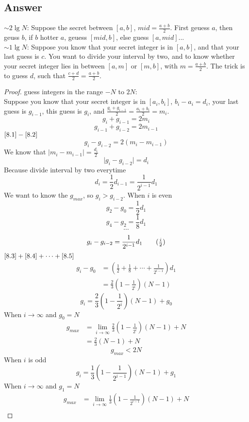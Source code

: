 \documentclass[12pt]{article}
\numberwithin{equation}{section}
\begin{document}
\subsection*{Answer}
$\sim$$2\lg{N}$: Suppose the secret between $[a, b]$, $mid=\frac{a+b}{2}$. First geuess $a$, then geuss $b$,
if $b$ hotter $a$, geuess $[mid, b]$, else guess $[a, mid]$...\\
$\sim$$1\lg{N}$: Suppose you know that your secret integer is in $[a,b]$, and that your last guess is $c$.
You want to divide your interval by two, and to know whether your secret integer lies in between $[a, m]$ or
$[m, b]$, with $m=\frac{a+b}{2}$. The trick is to guess $d$, such that $\frac{c+d}{2}=\frac{a+b}{2}$.
\begin{proof}
    guess integers in the range $-N$ to $2N$:\\
    Suppose you know that your secret integer is in $[a_i,b_i]$, $b_i-a_i=d_i$, your last guess
    is $g_{i-1}$, this guess is $g_i$, and $\frac{g_i+g_{i-1}}{2}=\frac{a_i+b_i}{2}=m_i$.
    \[g_i+g_{i-1}=2m_i \tag{1}\label{8.1}\]
    \[g_{i-1}+g_{i-2}=2m_{i-1} \tag{2}\label{8.2}\]
    $\eqref{8.1}-\eqref{8.2}$
    \[g_{i}-g_{i-2}=2(m_i-m_{i-1})\]
    We know that $\mid m_i-m_{i-1} \mid = \frac{d_i}{2}$
    \[\mid g_{i}-g_{i-2}\mid=d_i\]
    Because divide interval by two everytime
    \[d_i=\frac{1}{2}d_{i-1} = \frac{1}{2^{i-1}}d_1 \]
    We want to know the $g_{max}$, so $g_i>g_{i-2}$. When $i$ is even
    \[g_2-g_0=\frac{1}{2}d_1 \tag{1}\label{8.3}\]
    \[g_4-g_2=\frac{1}{8}d_1 \tag{2}\label{8.4}\]
    \[\cdots\]
    \[g_i-g_{i-2}=\frac{1}{2^{i-1}}d_1 \tag{$\frac{i}{2}$}\label{8.5}\]
    $\eqref{8.3}+\eqref{8.4}+\cdots+\eqref{8.5}$
    \begin{align*}
    g_i-g_0&=(\frac{1}{2}+\frac{1}{8}+\cdots+\frac{1}{2^{i-1}})d_1\\
    &=\frac{2}{3}(1-\frac{1}{2^{i}})(N-1)
    \end{align*}
    \[g_i=\frac{2}{3}(1-\frac{1}{2^i})(N-1)+g_0\]
    When $i \to \infty$ and $g_0=N$
    \begin{align*}
    g_{max}&=\lim_{i\to\infty}\frac{2}{3}(1-\frac{1}{2^i})(N-1)+N\\
    &=\frac{2}{3}(N-1)+N
    \end{align*}
    \[g_{max}<2N\]
    When $i$ is odd
    \[g_{i}=\frac{1}{3}(1-\frac{1}{2^{i-1}})(N-1)+g_1\]
    When $i \to \infty$ and $g_1=N$
    \begin{align*}
    g_{max}&=\lim_{i\to\infty}\frac{1}{3}(1-\frac{1}{2^{i-1}})(N-1)+N\\

\end{align*}
\end{proof}
\end{document}

